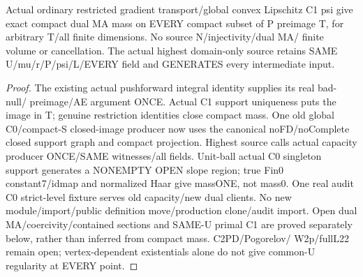 \begin{lemma}
  \label{lem:compact-dual-ma}
  \leanok
  Actual ordinary restricted gradient transport/global convex Lipschitz C1 psi
  give exact compact dual MA mass on EVERY compact subset of P preimage T,
  for arbitrary T/all finite dimensions. No source N/injectivity/dual MA/
  finite volume or cancellation. The actual highest domain-only source retains
  SAME U/mu/r/P/psi/L/EVERY field and GENERATES every intermediate input.
\end{lemma}
\begin{proof}
  \leanok
  The existing actual pushforward integral identity supplies its real bad-null/
  preimage/AE argument ONCE. Actual C1 support uniqueness puts the image in T;
  genuine restriction identities close compact mass. One old global C0/compact-S
  closed-image producer now uses the canonical noFD/noComplete closed support
  graph and compact projection.
  Highest source calls actual capacity producer ONCE/SAME witnesses/all fields.
  Unit-ball actual C0 singleton support generates a NONEMPTY OPEN slope region;
  true Fin0 constant7/idmap and normalized Haar give massONE, not mass0.
  One real audit C0 strict-level fixture serves old capacity/new dual clients.
  No new module/import/public definition move/production clone/audit import.
  Open dual MA/coercivity/contained sections and SAME-U primal C1 are proved
  separately below, rather than inferred from compact mass. C2PD/Pogorelov/
  W2p/fullL22 remain open; vertex-dependent existentials alone do not give
  common-U regularity at EVERY point.
\end{proof}


